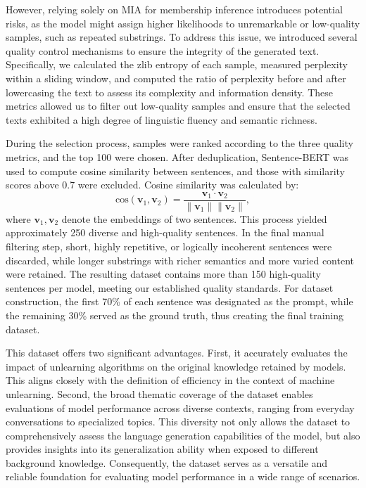 \documentclass{article}
\theoremstyle{plain}
\theoremstyle{definition}
\theoremstyle{remark}
\begin{document}
However, relying solely on MIA for membership inference introduces potential risks, as the model might assign higher likelihoods to unremarkable or low-quality samples, such as repeated substrings. To address this issue, we introduced several quality control mechanisms to ensure the integrity of the generated text. Specifically, we calculated the zlib entropy of each sample, measured perplexity within a sliding window, and computed the ratio of perplexity before and after lowercasing the text to assess its complexity and information density. These metrics allowed us to filter out low-quality samples and ensure that the selected texts exhibited a high degree of linguistic fluency and semantic richness.

During the selection process, samples were ranked according to the three quality metrics, and the top 100 were chosen. After deduplication, Sentence-BERT was used to compute cosine similarity between sentences, and those with similarity scores above 0.7 were excluded. Cosine similarity was calculated by:
\begin{equation}
	\text{cos}(\mathbf{v}_1, \mathbf{v}_2) = \frac{\mathbf{v}_1 \cdot \mathbf{v}_2}{\|\mathbf{v}_1\| \|\mathbf{v}_2\|},
\end{equation}
where $\mathbf{v}_1, \mathbf{v}_2$ denote the embeddings of two sentences.
This process yielded approximately 250 diverse and high-quality sentences.
In the final manual filtering step, short, highly repetitive, or logically incoherent sentences were discarded, while longer substrings with richer semantics and more varied content were retained. The resulting dataset contains more than 150 high-quality sentences per model, meeting our established quality standards.
For dataset construction, the first 70\% of each sentence was designated as the prompt, while the remaining 30\% served as the ground truth, thus creating the final training dataset.

This dataset offers two significant advantages. First, it accurately evaluates the impact of unlearning algorithms on the original knowledge retained by models. This aligns closely with the definition of efficiency in the context of machine unlearning.
Second, the broad thematic coverage of the dataset enables evaluations of model performance across diverse contexts, ranging from everyday conversations to specialized topics. This diversity not only allows the dataset to comprehensively assess the language generation capabilities of the model, but also provides insights into its generalization ability when exposed to different background knowledge. Consequently, the dataset serves as a versatile and reliable foundation for evaluating model performance in a wide range of scenarios.
\end{document}

